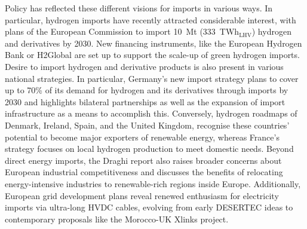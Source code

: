 
Policy has reflected these different visions for imports in various ways. In
particular, hydrogen imports have recently attracted considerable interest, with
plans of the European Commission\cite{europeancommissionRepowerEUPlan} to import
10~Mt (333~TWh$_\text{LHV}$) hydrogen and derivatives by 2030. New financing
instruments, like the European Hydrogen
Bank\cite{europeancommissionEuropeanHydrogenBank2024} or
H2Global\cite{h2globalfoundationH2Global2024} are set up to support the scale-up
of green hydrogen imports. Desire to import hydrogen and derivative products
is also present in various national
strategies.\cite{corbeauNationalHydrogenStrategies2024} In particular, Germany's
new import strategy plans to cover up to 70\% of its demand for hydrogen and its
derivatives through imports by 2030 and highlights bilateral partnerships as
well as the expansion of import infrastructure as a means to accomplish
this.\cite{germanfederalministryofeconomicaffairsandclimateactionbmwkNationalHydrogenStrategy2023,germanfederalministryofeconomicaffairsandclimateactionbmwkImportStrategyHydrogen2024}
Conversely, hydrogen roadmaps of
Denmark,\cite{danishministryofclimateenergyandutilitiesRegeringensStrategiPowertoX2021}
Ireland,\cite{departmentoftheenvironmentclimateandcommunicationsgovernmentofirelandNationalHydrogenStrategy2023} 
Spain,\cite{marcoestrategicodeenergiayclimaRutaHidrogenoApuesta2020} and the
United
Kingdom,\cite{ukdepartmentforenergysecurity&netzeroHydrogenStrategyUpdate2023}
recognise these countries' potential to become major exporters of renewable
energy, whereas France's strategy focuses on local hydrogen production to meet
domestic needs.\cite{frenchgovernmentStrategieNationalePour2023} Beyond direct
energy imports, the Draghi report\cite{draghiFutureEuropeanCompetitiveness2024}
also raises broader concerns about European industrial competitiveness and
discusses the benefits of relocating energy-intensive industries to renewable-rich
regions inside Europe. Additionally, European grid development
plans\cite{entso-eTYNDP2024Project2024} reveal renewed enthusiasm for
electricity imports via ultra-long HVDC cables, evolving from early
DESERTEC\cite{desertecfoundationDESERTECSustainableWealth2024} ideas to
contemporary proposals like the Morocco-UK Xlinks
project.\cite{xlinksMoroccoUKPowerProject2023}


